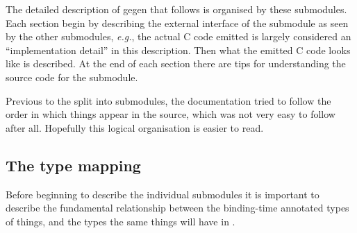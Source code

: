 \begin{docpart}
The detailed description of gegen that follows is organised by these
submodules. Each section begin by describing the external interface
of the submodule as seen by the other submodules, \emph{e.g.}, the
actual C code emitted is largely considered an ``implementation
detail'' in this description. Then what the emitted C code looks
like is described. At the end of each section there are tips for
understanding the source code for the submodule.

Previous to the split into submodules, the documentation
tried to follow the order in which things appear in the \Pgen source,
which was not very easy to follow after all. Hopefully this logical
organisation is easier to read.

\subsection{The type mapping}
\label{sec:gegen:TheTypeMapping}

Before beginning to describe the individual submodules it is important
to describe the fundamental relationship between the binding-time
annotated \coreC types of things, and the types the same things will
have in \Pgen.


\end{docpart}
